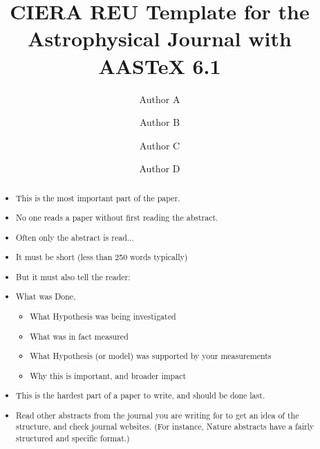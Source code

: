 \documentclass[twocolumn]{aastex61}
\begin{document}
\title{CIERA REU Template for the Astrophysical Journal with AASTeX 6.1}

\author{Author A}
\author{Author B}
\author{Author C}
\author{Author D}

\begin{abstract}
\begin{itemize}\itemsep0em
\item This is the most important part of the paper. 
\item No one reads a paper without first reading the abstract. 
\item Often only the abstract is read...
\item It must be short (less than 250 words typically)
\item But it must also tell the reader: 
\item What was Done,
\begin{itemize}\itemsep0em
\item What Hypothesis was being investigated
\item What was in fact measured
\item What Hypothesis (or model) was supported by your measurements
\item Why this is important, and broader impact
\end{itemize}
\item This is the hardest part of a paper to write, and should be done last.
\item Read other abstracts from the journal you are writing for to get an idea of the structure, and check journal websites.  (For instance, Nature abstracts have a fairly structured and specific format.)
\end{itemize}
\end{abstract}

\end{document}
